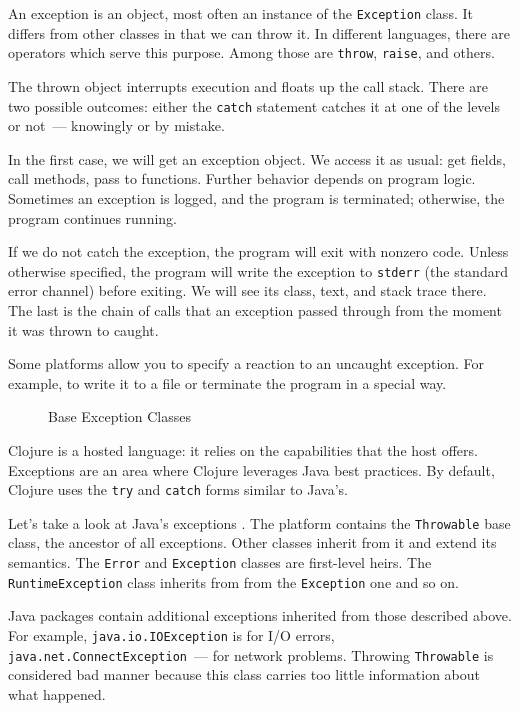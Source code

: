 An exception is an object, most often an instance of the \verb|Exception| class. It differs from other classes in that we can throw it. In different languages, there are operators which serve this purpose. Among those are \verb|throw|, \verb|raise|, and others.

The thrown object interrupts execution and floats up the call stack. There are two possible outcomes: either the \verb|catch| statement catches it at one of the levels or not~--- knowingly or by mistake.

In the first case, we will get an exception object. We access it as usual: get fields, call methods, pass to functions. Further behavior depends on program logic. Sometimes an exception is logged, and the program is terminated; otherwise, the program continues running.

If we do not catch the exception, the program will exit with nonzero code. Unless otherwise specified, the program will write the exception to \verb|stderr| (the standard error channel) before exiting. We will see its class, text, and stack trace there. The last is the chain of calls that an exception passed through from the moment it was thrown to caught.


Some platforms allow you to specify a reaction to an uncaught exception. For example, to write it to a file or terminate the program in a special way.

\begin{figure}[ht!]
  \caption{Base Exception Classes}
  \label{fig:exceptions}
\end{figure}

Clojure is a hosted language: it relies on the capabilities that the host offers. Exceptions are an area where Clojure leverages Java best practices. By default, Clojure uses the \verb|try| and \verb|catch| forms similar to Java's.


Let's take a look at Java's exceptions . The platform contains the \texttt{Throwable} base class, the ancestor of all exceptions. Other classes inherit from it and extend its semantics. The \verb|Error| and \verb|Exception| classes are first-level heirs. The \verb|RuntimeException| class inherits from from the \verb|Exception| one and so on.


Java packages contain additional exceptions inherited from those described above. For example, \verb|java.io.IOException| is for I/O errors, \verb|java.net.ConnectException|~--- for network problems. Throwing \verb|Throwable| is considered bad manner because this class carries too little information about what happened.

